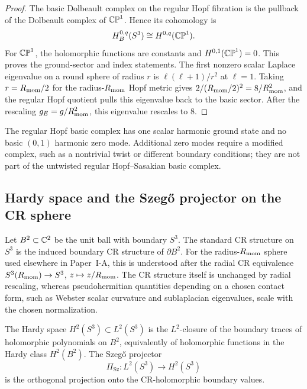 \documentclass[11pt]{article}
\begin{document}
\begin{proof}
The basic Dolbeault complex on the regular Hopf fibration is the pullback of the Dolbeault complex of
\(\mathbb{CP}^1\).  Hence its cohomology is
\[
H_B^{0,q}(S^3)\cong H^{0,q}(\mathbb{CP}^1).
\]
For \(\mathbb{CP}^1\), the holomorphic functions are constants and \(H^{0,1}(\mathbb{CP}^1)=0\).  This proves the ground-sector
and index statements.  The first nonzero scalar Laplace eigenvalue on a round sphere of radius \(r\) is
\(\ell(\ell+1)/r^2\) at \(\ell=1\).  Taking \(r=R_{\mathrm{mom}}/2\) for the radius-\(R_{\mathrm{mom}}\)
Hopf metric gives \(2/(R_{\mathrm{mom}}/2)^2=8/R_{\mathrm{mom}}^2\), and the regular Hopf quotient pulls
this eigenvalue back to the basic sector. After the rescaling \(g_E=g/R_{\mathrm{mom}}^2\),
this eigenvalue rescales to \(8\).
\end{proof}

\begin{remark}
\label{p1:rem:basic-dolbeault-zero-mode-boundary}
The regular Hopf basic complex has one scalar harmonic ground state and no
basic \((0,1)\) harmonic zero mode.  Additional zero modes require a modified
complex, such as a nontrivial twist or different boundary conditions; they are
not part of the untwisted regular Hopf--Sasakian basic complex.
\end{remark}
\subsection{Hardy space and the Szeg\H{o} projector on the CR sphere}
\label{p1:subsec:szego-cr}

Let \(B^2\subset\mathbb{C}^2\) be the unit ball with boundary \(S^3\). The standard CR
structure on \(S^3\) is the induced boundary CR structure of \(\partial B^2\).
For the radius-\(R_{\mathrm{mom}}\) sphere used elsewhere in Paper~I-A, this is understood after
the radial CR equivalence \(S^3(R_{\mathrm{mom}})\to S^3\), \(z\mapsto z/R_{\mathrm{mom}}\).  The CR structure itself is unchanged by radial rescaling, whereas pseudohermitian quantities depending on a chosen contact form, such as Webster scalar curvature and sublaplacian eigenvalues, scale with the chosen normalization.

\begin{theorem}
\label{p1:thm:hardy-szego-projection}
The Hardy space \(H^2(S^3)\subset L^2(S^3)\) is the \(L^2\)-closure of the boundary traces of holomorphic polynomials on \(B^2\), equivalently of holomorphic functions in the Hardy class \(H^2(B^2)\). The Szeg\H{o} projector
\[
\Pi_{\mathrm{Sz}}:L^2(S^3)\to H^2(S^3)
\]
is the orthogonal projection onto the CR-holomorphic boundary values.
\end{theorem}
\end{document}
